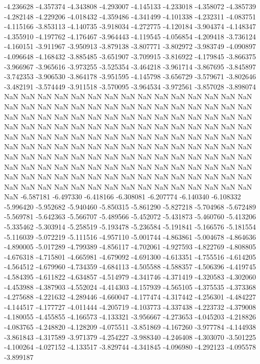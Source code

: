 -4.236628
-4.357374
-4.343808
-4.293007
-4.145133
-4.233018
-4.358072
-4.385739
-4.282148
-4.229206
-4.018432
-4.359486
-4.341499
-4.101338
-4.232311
-4.083751
-4.115166
-3.853113
-4.140735
-3.918034
-4.272775
-4.120184
-3.904374
-4.148347
-4.355910
-4.197762
-4.176467
-3.964443
-4.119545
-4.056854
-4.209418
-3.736124
-4.160151
-3.911967
-3.950913
-3.879138
-3.807771
-3.802972
-3.983749
-4.090897
-4.096648
-4.168432
-3.885485
-3.651907
-3.709915
-3.816922
-4.179845
-3.866375
-3.966967
-3.965616
-3.973255
-3.525354
-3.464218
-3.961714
-3.867695
-3.845897
-3.742353
-3.906530
-3.864178
-3.951595
-4.145798
-3.656729
-3.579671
-3.802646
-3.482191
-3.574449
-3.911518
-3.570095
-3.964534
-3.972561
-3.857028
-3.898074
NaN
NaN
NaN
NaN
NaN
NaN
NaN
NaN
NaN
NaN
NaN
NaN
NaN
NaN
NaN
NaN
NaN
NaN
NaN
NaN
NaN
NaN
NaN
NaN
NaN
NaN
NaN
NaN
NaN
NaN
NaN
NaN
NaN
NaN
NaN
NaN
NaN
NaN
NaN
NaN
NaN
NaN
NaN
NaN
NaN
NaN
NaN
NaN
NaN
NaN
NaN
NaN
NaN
NaN
NaN
NaN
NaN
NaN
NaN
NaN
NaN
NaN
NaN
NaN
NaN
NaN
NaN
NaN
NaN
NaN
NaN
NaN
NaN
NaN
NaN
NaN
NaN
NaN
NaN
NaN
NaN
NaN
NaN
NaN
NaN
NaN
NaN
NaN
NaN
NaN
NaN
NaN
NaN
NaN
NaN
NaN
NaN
NaN
NaN
NaN
NaN
NaN
NaN
NaN
NaN
NaN
NaN
NaN
NaN
NaN
NaN
NaN
NaN
NaN
NaN
NaN
NaN
NaN
NaN
NaN
NaN
NaN
NaN
NaN
NaN
NaN
NaN
NaN
NaN
NaN
NaN
NaN
NaN
NaN
NaN
NaN
NaN
NaN
NaN
NaN
NaN
NaN
NaN
NaN
NaN
NaN
NaN
NaN
NaN
NaN
NaN
-6.587181
-6.497330
-6.418166
-6.308081
-6.207774
-6.140340
-6.108332
-5.996420
-5.952682
-5.940460
-5.850315
-5.861290
-5.827218
-5.704968
-5.672489
-5.569781
-5.642363
-5.566707
-5.489566
-5.452072
-5.431873
-5.460760
-5.413206
-5.335462
-5.303914
-5.258519
-5.193478
-5.236584
-5.191841
-5.166576
-5.181554
-5.116039
-5.072219
-5.111516
-4.957110
-5.001744
-4.863861
-5.004678
-4.864636
-4.890005
-5.017289
-4.799389
-4.856117
-4.702061
-4.927593
-4.822769
-4.808805
-4.676318
-4.715801
-4.665981
-4.679092
-4.691300
-4.613351
-4.755516
-4.614205
-4.564512
-4.679960
-4.734359
-4.684113
-4.505588
-4.588357
-4.506396
-4.419745
-4.584395
-4.611822
-4.634857
-4.514979
-4.341746
-4.371419
-4.320583
-4.302060
-4.453988
-4.387903
-4.552024
-4.414303
-4.157939
-4.565105
-4.375535
-4.373368
-4.275688
-4.221632
-4.289446
-4.660047
-4.177474
-4.317442
-4.256301
-4.484227
-4.144517
-4.177727
-4.011444
-4.205719
-4.103773
-4.337438
-4.223732
-4.379008
-4.180055
-4.455855
-4.166573
-4.133321
-3.956667
-4.273653
-4.045203
-4.218826
-4.083765
-4.248820
-4.128209
-4.075511
-3.851869
-4.167260
-3.977784
-4.144938
-3.861843
-4.317589
-3.971379
-4.254227
-3.988340
-4.246408
-4.303070
-3.501225
-4.100264
-4.027152
-4.133517
-3.829744
-4.341845
-4.096980
-4.292123
-4.095578
-3.899187
